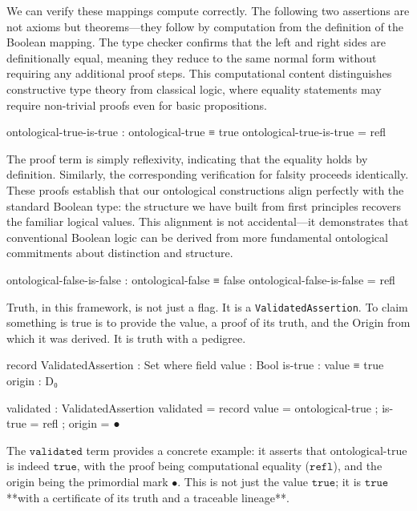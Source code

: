 \documentclass[11pt,a4paper]{book}
\begin{document}
We can verify these mappings compute correctly. The following two assertions are not axioms but theorems—they follow by computation from the definition of the Boolean mapping. The type checker confirms that the left and right sides are definitionally equal, meaning they reduce to the same normal form without requiring any additional proof steps. This computational content distinguishes constructive type theory from classical logic, where equality statements may require non-trivial proofs even for basic propositions.

\begin{code}
ontological-true-is-true : ontological-true ≡ true
ontological-true-is-true = refl
\end{code}

The proof term is simply reflexivity, indicating that the equality holds by definition. Similarly, the corresponding verification for falsity proceeds identically. These proofs establish that our ontological constructions align perfectly with the standard Boolean type: the structure we have built from first principles recovers the familiar logical values. This alignment is not accidental—it demonstrates that conventional Boolean logic can be derived from more fundamental ontological commitments about distinction and structure.

\begin{code}
ontological-false-is-false : ontological-false ≡ false
ontological-false-is-false = refl
\end{code}

Truth, in this framework, is not just a flag. It is a \texttt{ValidatedAssertion}. To claim something is true is to provide the value, a proof of its truth, and the Origin from which it was derived. It is truth with a pedigree.

\begin{code}
record ValidatedAssertion : Set where
  field
    value : Bool
    is-true : value ≡ true
    origin : D₀
\end{code}

\begin{code}
validated : ValidatedAssertion
validated = record
  { value = ontological-true
  ; is-true = refl
  ; origin = ●
  }
\end{code}

The $\texttt{validated}$ term provides a concrete example: it asserts that 
$\text{ontological-true}$ is indeed $\texttt{true}$, with the proof being 
computational equality ($\texttt{refl}$), and the origin being the primordial 
mark $\bullet$. This is not just the value $\texttt{true}$; it is $\texttt{true}$ 
**with a certificate of its truth and a traceable lineage**.
\end{document}
